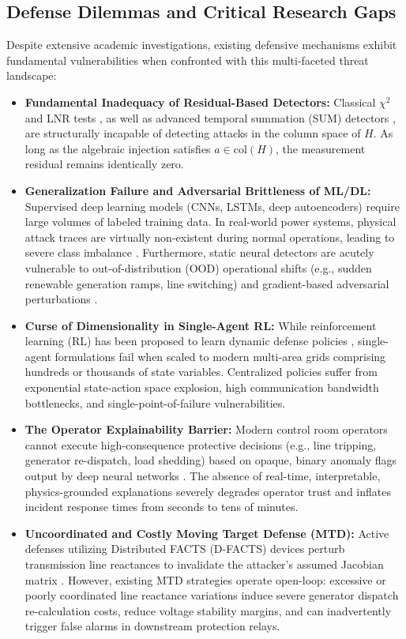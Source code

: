 \documentclass[journal,compsoc]{IEEEtran}
\begin{document}
\subsection{Defense Dilemmas and Critical Research Gaps}
Despite extensive academic investigations, existing defensive mechanisms exhibit fundamental vulnerabilities when confronted with this multi-faceted threat landscape:
\begin{itemize}
    \item \textbf{Fundamental Inadequacy of Residual-Based Detectors:} Classical $\chi^2$ and LNR tests \cite{ref10}, as well as advanced temporal summation (SUM) detectors \cite{ref18}, are structurally incapable of detecting attacks in the column space of $H$. As long as the algebraic injection satisfies $a \in \text{col}(H)$, the measurement residual remains identically zero.
    \item \textbf{Generalization Failure and Adversarial Brittleness of ML/DL:} Supervised deep learning models (CNNs, LSTMs, deep autoencoders) require large volumes of labeled training data. In real-world power systems, physical attack traces are virtually non-existent during normal operations, leading to severe class imbalance \cite{ref66, ref68}. Furthermore, static neural detectors are acutely vulnerable to out-of-distribution (OOD) operational shifts (e.g., sudden renewable generation ramps, line switching) and gradient-based adversarial perturbations \cite{ref35}.
    \item \textbf{Curse of Dimensionality in Single-Agent RL:} While reinforcement learning (RL) has been proposed to learn dynamic defense policies \cite{ref34}, single-agent formulations fail when scaled to modern multi-area grids comprising hundreds or thousands of state variables. Centralized policies suffer from exponential state-action space explosion, high communication bandwidth bottlenecks, and single-point-of-failure vulnerabilities.
    \item \textbf{The Operator Explainability Barrier:} Modern control room operators cannot execute high-consequence protective decisions (e.g., line tripping, generator re-dispatch, load shedding) based on opaque, binary anomaly flags output by deep neural networks \cite{ref12, ref13}. The absence of real-time, interpretable, physics-grounded explanations severely degrades operator trust and inflates incident response times from seconds to tens of minutes.
    \item \textbf{Uncoordinated and Costly Moving Target Defense (MTD):} Active defenses utilizing Distributed FACTS (D-FACTS) devices perturb transmission line reactances to invalidate the attacker's assumed Jacobian matrix \cite{ref4, ref54, ref68}. However, existing MTD strategies operate open-loop: excessive or poorly coordinated line reactance variations induce severe generator dispatch re-calculation costs, reduce voltage stability margins, and can inadvertently trigger false alarms in downstream protection relays.
\end{itemize}
\end{document}
